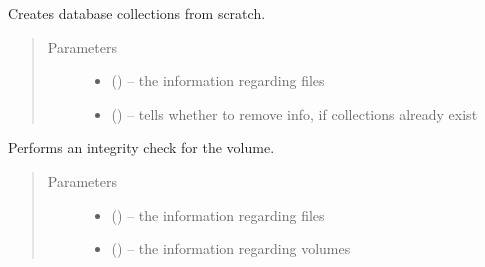 \documentclass[letterpaper,10pt,english]{sphinxmanual}
\begin{document}

\begin{fulllineitems}
\label{\detokenize{index:fsbackup.commands.createDatabase}}
Creates database collections from scratch.
\begin{quote}\begin{description}
\item[{Parameters}] \leavevmode\begin{itemize}
\item {} 
 ({\hyperref[\detokenize{index:fsbackup.fileDB.FileDB}]{}}) -- the information regarding files

\item {} 
 () -- tells whether to remove info, if collections already exist

\end{itemize}

\end{description}\end{quote}

\end{fulllineitems}


\begin{fulllineitems}
\label{\detokenize{index:fsbackup.commands.integrityCheck}}
Performs an integrity check for the volume.
\begin{quote}\begin{description}
\item[{Parameters}] \leavevmode\begin{itemize}
\item {} 
 ({\hyperref[\detokenize{index:fsbackup.fileDB.FileDB}]{}}) -- the information regarding files

\item {} 
 ({\hyperref[\detokenize{index:fsbackup.hashVolume.HashVolume}]{}}) -- the information regarding volumes

\end{itemize}

\end{description}\end{quote}

\end{fulllineitems}
\end{document}
